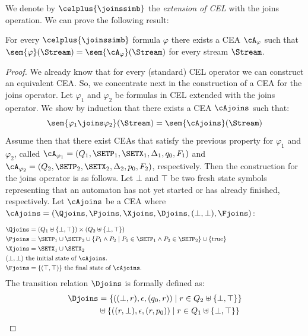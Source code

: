 We denote by $\celplus{\joinssimb}$ the \emph{extension of CEL} with the joins operation. We can prove the following result:

\begin{theorem} \label{theo:joins}
	For every $\celplus{\joinssimb}$ formula $\varphi$ there exists a CEA $\cA_\varphi$ such that $\sem{\varphi}(\Stream) = \sem{\cA_\varphi}(\Stream)$ for every stream $\Stream$.
\end{theorem}

\begin{proof}
	We already know that for every (standard) CEL operator we can construct an equivalent CEA. So, we concentrate next in the construction of a CEA for the joins operator. 
	Let $\varphi_1$ and $\varphi_2$ be formulas in CEL extended with the joins operator. We show by induction that there exists a CEA $\cAjoins$ such that:
	\[
	\sem{\varphi_1 \joins \varphi_2}(\Stream) = \sem{\cAjoins}(\Stream)
	\]
	Assume then that there exist CEAs that satisfy the previous property for $\varphi_1$ and $\varphi_2$, called $\cA_{\varphi_1} = (Q_1, \SETP_1, \SETX_1, \Delta_1, q_0, F_1)$ and $\cA_{\varphi_2} = (Q_2, \SETP_2, \SETX_2, \Delta_2, p_0, F_2)$, respectively. 
	Then the construction for the joins operator is as follows. Let $\bot$ and $\top$ be two fresh state symbols representing that an automaton has not yet started or has already finished, respectively.
	Let $\cAjoins$ be a CEA where $\cAjoins = (\Qjoins, \Pjoins, \Xjoins, \Djoins, (\bot, \bot), \Fjoins)$:
	\[
	\begin{aligned}[t]
		& \Qjoins = (Q_1 \uplus \{\bot, \top\}) \times (Q_2 \uplus \{\bot, \top\}) \\
		& \Pjoins = \SETP_1 \cup \SETP_2 \cup \{ P_1 \land P_2 \mid P_1 \in \SETP_1 \land P_2 \in \SETP_2 \} \cup \{\text{true}\} \hspace*{120px}\\
		& \Xjoins  = \SETX_1 \cup \SETX_2 \\
		& (\bot, \bot) \text{ the initial state of }\cAjoins.\\
		& \Fjoins = \{(\top, \top)\} \text{ the final state of } \cAjoins.
	\end{aligned}
	\]
	The transition relation $\Djoins$ is formally defined as:
	\[
	\begin{aligned}[t]
		\Djoins & = \{((\bot, r), \epsilon, (q_0, r)) \mid r \in Q_2 \uplus \{\bot, \top\}\} \\
		& \uplus \{((r, \bot), \epsilon, (r, p_0)) \mid r \in Q_1 \uplus \{\bot, \top\}\} \\

\end{aligned}\]
\end{proof}
